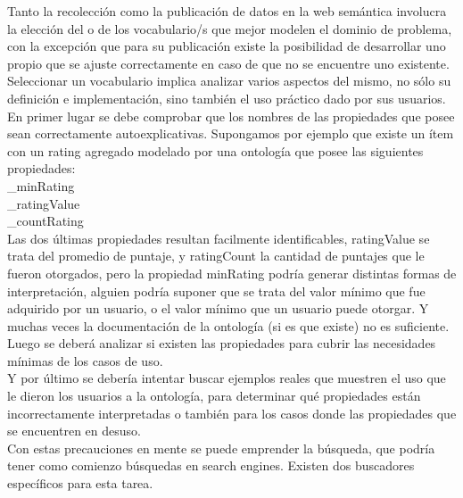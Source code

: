 Tanto la recolección como la publicación de datos en la web semántica involucra la elección del o de los vocabulario/s que 
mejor modelen el dominio de problema, con la excepción que para su publicación existe la posibilidad de desarrollar uno propio 
que se ajuste correctamente en caso de que no se encuentre uno existente. \\
Seleccionar un vocabulario implica analizar varios aspectos del mismo, no sólo su definición e implementación, sino también 
el uso práctico dado por sus usuarios. \\
En primer lugar se debe comprobar que los nombres de las propiedades que posee sean correctamente autoexplicativas. Supongamos 
por ejemplo que existe un ítem con un rating agregado modelado por una ontología que posee las siguientes propiedades:\\
_minRating\\
_ratingValue\\
_countRating\\
Las dos últimas propiedades resultan facilmente identificables, ratingValue se trata del promedio de puntaje, y ratingCount 
la cantidad de puntajes que le fueron otorgados, pero la propiedad minRating podría generar distintas formas de interpretación, 
alguien podría suponer que se trata del valor mínimo que fue adquirido por un usuario, o el valor mínimo que un usuario puede 
otorgar. Y muchas veces la documentación de la ontología (si es que existe) no es suficiente.\\
Luego se deberá analizar si existen las propiedades para cubrir las necesidades mínimas de los casos de uso.\\
Y por último se debería intentar buscar ejemplos reales que muestren el uso que le dieron los usuarios a la ontología, para 
determinar qué propiedades están incorrectamente interpretadas o también para los casos donde las propiedades que se encuentren 
en desuso.\\
Con estas precauciones en mente se puede emprender la búsqueda, que podría tener como comienzo búsquedas en  search engines. 
Existen dos buscadores específicos para esta tarea.\\

